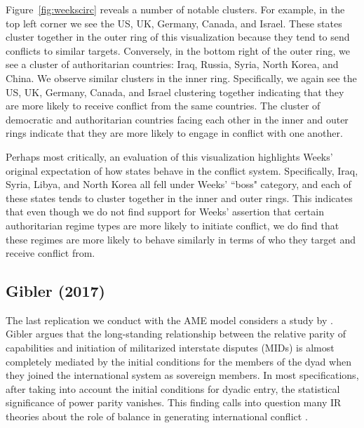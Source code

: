 Figure~\ref{fig:weekscirc} reveals a number of notable clusters. For example, in the top left corner we see the US, UK, Germany, Canada, and Israel. These states cluster together in the outer ring of this visualization because they tend to send conflicts to similar targets. Conversely, in the bottom right of the outer ring, we see a cluster of authoritarian countries: Iraq, Russia, Syria, North Korea, and China. We observe similar clusters in the inner ring. Specifically, we again see the US, UK, Germany, Canada, and Israel clustering together indicating that they are more likely to receive conflict from the same countries.  The  cluster of democratic and authoritarian countries facing each other in the inner and outer rings indicate that they are more likely to engage in conflict with one another.

Perhaps most critically, an evaluation of this visualization highlights Weeks' original expectation of how states behave in the conflict system.  Specifically, Iraq, Syria, Libya, and North Korea all fell under Weeks' ``boss" category, and each of these states tends to cluster together in the inner and outer rings. This indicates that even though we do not find support for Weeks' assertion that certain authoritarian regime types are more likely to initiate conflict, we do find that these regimes are more likely to behave similarly in terms of who they target and receive conflict from.

\subsection{Gibler (2017)}

The last replication we conduct with the AME model considers a study by \citet{gibler:2017}. Gibler argues that the long-standing relationship between the relative parity of capabilities and initiation of militarized interstate disputes (MIDs) is almost completely mediated by the initial conditions for the members of the dyad when they joined the international system as sovereign members. In most specifications, after taking into account the initial conditions for dyadic entry, the statistical significance of power parity vanishes. This finding calls into question many IR theories about the role of balance in generating international conflict \citep{organski:1958}.

